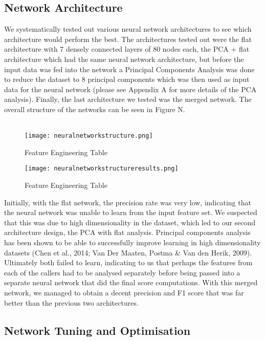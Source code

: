 \documentclass{article}
\begin{document}
\subsection{Network Architecture}
We systematically tested out various neural network architectures to see which architecture would perform the best. The architectures tested out were the flat architecture with 7 densely connected layers of 80 nodes each, the PCA + flat architecture which had the same neural network architecture, but before the input data was fed into the network a Principal Components Analysis was done to reduce the dataset to 8 principal components which was then used as input data for the neural network (please see Appendix A for more details of the PCA analysis). Finally, the last architecture we tested was the merged network. The overall structure of the networks can be seen in Figure N. \\\\

\begin{figure}[H]
\caption{Feature Engineering Table}
\texttt{[image: neuralnetworkstructure.png]}
\centering
\end{figure}

\begin{figure}[H]
\caption{Feature Engineering Table}
\texttt{[image: neuralnetworkstructureresults.png]}
\centering
\end{figure}
Initially, with the flat network, the precision rate was very low, indicating that the neural network was unable to learn from the input feature set. We suspected that this was due to high dimensionality in the dataset, which led to our second architecture design, the PCA with flat analysis. Principal components analysis has been shown to be able to successfully improve learning in high dimensionality datasets (Chen et al., 2014; Van Der Maaten, Postma \& Van den Herik, 2009). Ultimately both failed to learn, indicating to us that perhaps the features from each of the callers had to be analysed separately before being passed into a separate neural network that did the final score computations. With this merged network, we managed to obtain a decent precision and F1 score that was far better than the previous two architectures. 


\subsection{Network Tuning and Optimisation}
\end{document}
